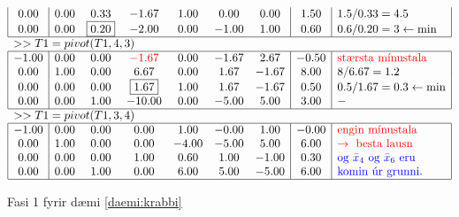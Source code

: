 \begin{lausn}
\begin{center}
\begin{table}[t!]
{{$$\begin{array}{|c|cccccc|c|l|}
0.00 & 0.00 & 0.33 & -1.67 & 1.00 & 0.00 & 0.00 & 1.50 & 1.5/0.33=4.5\\
0.00 & 0.00 & \fbox{0.20} & -2.00 & 0.00 & -1.00 & 1.00 & 0.60 & 0.6/0.20=3\leftarrow \min \\
\hline \multicolumn{8}{l}{>> T1=pivot(T1,4,3)} \\ \hline
-1.00 & 0.00 & 0.00 & \color{red}{-1.67} & 0.00 & -1.67 & 2.67 & -0.50 & \color{red}{\textrm{stærsta mínustala}}\\
0.00 & 1.00 & 0.00 & 6.67 & 0.00 & 1.67 & -1.67 & 8.00 & 8/6.67=1.2 \\
0.00 & 0.00 & 0.00 & \fbox{1.67} & 1.00 & 1.67 & -1.67 & 0.50 & 0.5/1.67=0.3\leftarrow \min \\
0.00 & 0.00 & 1.00 & -10.00 & 0.00 & -5.00 & 5.00 & 3.00 & -\\
\hline \multicolumn{8}{l}{>> T1=pivot(T1,3,4)} \\ \hline
-1.00 & 0.00 & 0.00 & 0.00 & 1.00 & -0.00 & 1.00 & -0.00 & \color{red}{\textrm{engin mínustala}}\\
0.00 & 1.00 & 0.00 & 0.00 & -4.00 & -5.00 & 5.00 & 6.00 & \color{red}{\rightarrow \textrm{ besta lausn}}\\
0.00 & 0.00 & 0.00 & 1.00 & 0.60 & 1.00 & -1.00 & 0.30 & \color{blue}{\textrm{og }\bar{x}_4 \textrm{ og }\bar{x}_6\textrm{ eru}}\\
0.00 & 0.00 & 1.00 & 0.00 & 6.00 & 5.00 & -5.00 & 6.00 & \color{blue}{\textrm{komin úr grunni.}}\\
\hline
\end{array}$$}}
\caption{Fasi 1 fyrir dæmi \ref{daemi:krabbi}}\label{daemi:krabbi:fasi1}
\end{table}


\end{center}
\end{lausn}
